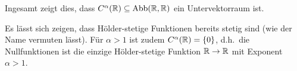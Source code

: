 Ingesamt zeigt dies, dass $C^\alpha(\mathbb{R}) \subseteq \mathrm{Abb}(\mathbb{R}, \mathbb{R})$ ein Untervektorraum ist.

\begin{bem}
 Es lässt sich zeigen, dass Hölder-stetige Funktionen bereits stetig sind (wie der Name vermuten lässt). Für $\alpha > 1$ ist zudem $C^\alpha(\mathbb{R}) = \{0\}$, d.h.\ die Nullfunktionen ist die einzige Hölder-stetige Funktion $\mathbb{R} \to \mathbb{R}$ mit Exponent $\alpha > 1$.
\end{bem}















